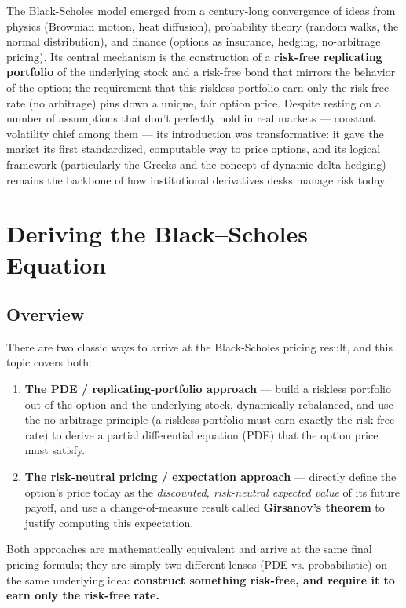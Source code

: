 \documentclass[12pt,openany]{book}
\theoremstyle{definition}
\theoremstyle{remark}
\begin{document}
The Black-Scholes model emerged from a century-long convergence of ideas from physics (Brownian motion, heat diffusion), probability theory (random walks, the normal distribution), and finance (options as insurance, hedging, no-arbitrage pricing). Its central mechanism is the construction of a \textbf{risk-free replicating portfolio} of the underlying stock and a risk-free bond that mirrors the behavior of the option; the requirement that this riskless portfolio earn only the risk-free rate (no arbitrage) pins down a unique, fair option price. Despite resting on a number of assumptions that don't perfectly hold in real markets --- constant volatility chief among them --- its introduction was transformative: it gave the market its first standardized, computable way to price options, and its logical framework (particularly the Greeks and the concept of dynamic delta hedging) remains the backbone of how institutional derivatives desks manage risk today.

\chapter{Deriving the Black--Scholes Equation}

\section{Overview}

There are two classic ways to arrive at the Black-Scholes pricing result, and this topic covers both:

\begin{enumerate}
\item \textbf{The PDE / replicating-portfolio approach} --- build a riskless portfolio out of the option and the underlying stock, dynamically rebalanced, and use the no-arbitrage principle (a riskless portfolio must earn exactly the risk-free rate) to derive a partial differential equation (PDE) that the option price must satisfy.


\item \textbf{The risk-neutral pricing / expectation approach} --- directly define the option's price today as the \emph{discounted, risk-neutral expected value} of its future payoff, and use a change-of-measure result called \textbf{Girsanov's theorem} to justify computing this expectation.


\end{enumerate}

Both approaches are mathematically equivalent and arrive at the same final pricing formula; they are simply two different lenses (PDE vs. probabilistic) on the same underlying idea: \textbf{construct something risk-free, and require it to earn only the risk-free rate.}
\end{document}
